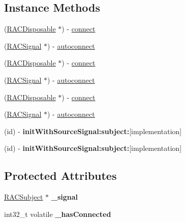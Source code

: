 \subsection*{Instance Methods}
\begin{DoxyCompactItemize}
\item 
(\mbox{\hyperlink{interface_r_a_c_disposable}{R\+A\+C\+Disposable}} $\ast$) -\/ \mbox{\hyperlink{interface_r_a_c_multicast_connection_a62299415a12cbd53ba5fded7e89584ef}{connect}}
\item 
(\mbox{\hyperlink{interface_r_a_c_signal}{R\+A\+C\+Signal}} $\ast$) -\/ \mbox{\hyperlink{interface_r_a_c_multicast_connection_a9a2c385b945f926a9e89a5170bd41dc0}{autoconnect}}
\item 
(\mbox{\hyperlink{interface_r_a_c_disposable}{R\+A\+C\+Disposable}} $\ast$) -\/ \mbox{\hyperlink{interface_r_a_c_multicast_connection_a62299415a12cbd53ba5fded7e89584ef}{connect}}
\item 
(\mbox{\hyperlink{interface_r_a_c_signal}{R\+A\+C\+Signal}} $\ast$) -\/ \mbox{\hyperlink{interface_r_a_c_multicast_connection_a9a2c385b945f926a9e89a5170bd41dc0}{autoconnect}}
\item 
(\mbox{\hyperlink{interface_r_a_c_disposable}{R\+A\+C\+Disposable}} $\ast$) -\/ \mbox{\hyperlink{interface_r_a_c_multicast_connection_a62299415a12cbd53ba5fded7e89584ef}{connect}}
\item 
(\mbox{\hyperlink{interface_r_a_c_signal}{R\+A\+C\+Signal}} $\ast$) -\/ \mbox{\hyperlink{interface_r_a_c_multicast_connection_a9a2c385b945f926a9e89a5170bd41dc0}{autoconnect}}
\item 
\mbox{\label{interface_r_a_c_multicast_connection_aa107d5d404a36f130afea68cf2a3bf2e}} 
(id) -\/ {\bfseries init\+With\+Source\+Signal\+:subject\+:}{\ttfamily  \mbox{[}implementation\mbox{]}}
\item 
\mbox{\label{interface_r_a_c_multicast_connection_aa107d5d404a36f130afea68cf2a3bf2e}} 
(id) -\/ {\bfseries init\+With\+Source\+Signal\+:subject\+:}{\ttfamily  \mbox{[}implementation\mbox{]}}
\end{DoxyCompactItemize}
\subsection*{Protected Attributes}
\begin{DoxyCompactItemize}
\item 
\mbox{\label{interface_r_a_c_multicast_connection_adbdc84840be9221db67c049463aff632}} 
\mbox{\hyperlink{interface_r_a_c_subject}{R\+A\+C\+Subject}} $\ast$ {\bfseries \+\_\+signal}
\item 
\mbox{\label{interface_r_a_c_multicast_connection_ae48a878246d9424c4ef009aa75d04be1}} 
int32\+\_\+t volatile {\bfseries \+\_\+has\+Connected}
\end{DoxyCompactItemize}
